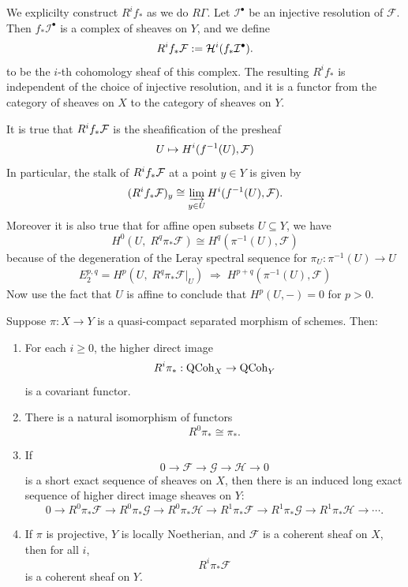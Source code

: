 \documentclass[12pt]{article}
\begin{document}
We explicilty construct $R^i f_*$ as we do $R\Gamma$. Let $\mathcal I^\bullet$ be an injective resolution of $\mathcal F$. Then $f_*\mathcal I^\bullet$ is a complex of sheaves on $Y$, and we define \begin{align*}
    R^i f_*\mathcal F := {\mathcal{H}}^i(f_*\mathcal I^\bullet).
\end{align*} to be the $i$-th cohomology sheaf of this complex. The resulting $R^i f_*$ is independent of the choice of injective resolution, and it is a functor from the category of sheaves on $X$ to the category of sheaves on $Y$.

It is true that $R^if_*{\mathcal{F}}$ is the sheafification of the presheaf
\[U\mapsto H^i(f^{-1}(U),{\mathcal{F}})\] In particular, the stalk of $R^if_*{\mathcal{F}}$ at a point $y\in Y$ is given by
\[(R^if_*{\mathcal{F}})_y\cong \varinjlim_{y\in U} H^i(f^{-1}(U),{\mathcal{F}}).\] Moreover it is also true that for affine open subsets $U\subseteq Y$, we have
\[H^0\!\left(U,\;R^q\pi_*\mathcal F\right)
    \cong
    H^q\!\left(\pi^{-1}(U),\mathcal F\right)\]
because of the degeneration of the Leray spectral sequence for $\pi_U:\pi^{-1}(U)\to U$ \begin{align*}
    E_2^{p,q}=H^p\!\left(U,\;R^q\pi_*\mathcal F|_U\right)
    \;\Rightarrow\;
    H^{p+q}\!\left(\pi^{-1}(U),\mathcal F\right)
\end{align*} Now use the fact that $U$ is affine to conclude that $H^p(U,-)=0$ for $p>0$.

\begin{theorem}\label{thm:higher-direct-images}
    Suppose \(\pi:X\to Y\) is a quasi-compact separated morphism of schemes. Then:
    \begin{enumerate}
        \item[(a)] For each \(i\ge 0\), the higher direct image
              \[
                  R^i\pi_*:\operatorname{QCoh}_X\to \operatorname{QCoh}_Y
              \]
              is a covariant functor.

        \item[(b)] There is a natural isomorphism of functors
              \[
                  R^0\pi_*\cong \pi_*.
              \]

        \item[(c)] If
              \[
                  0\to \mathcal F\to \mathcal G\to \mathcal H\to 0
              \]
              is a short exact sequence of sheaves on \(X\), then there is an induced long exact sequence of higher direct image sheaves on \(Y\):
              \[
                  0\to R^0\pi_*\mathcal F\to R^0\pi_*\mathcal G\to R^0\pi_*\mathcal H
                  \to R^1\pi_*\mathcal F\to R^1\pi_*\mathcal G\to R^1\pi_*\mathcal H\to \cdots .
              \]

        \item[(d)] If \(\pi\) is projective, \(Y\) is locally Noetherian, and \(\mathcal F\) is a coherent sheaf on \(X\), then for all \(i\),
              \[
                  R^i\pi_*\mathcal F
              \]
              is a coherent sheaf on \(Y\).
    \end{enumerate}
\end{theorem}
\end{document}
